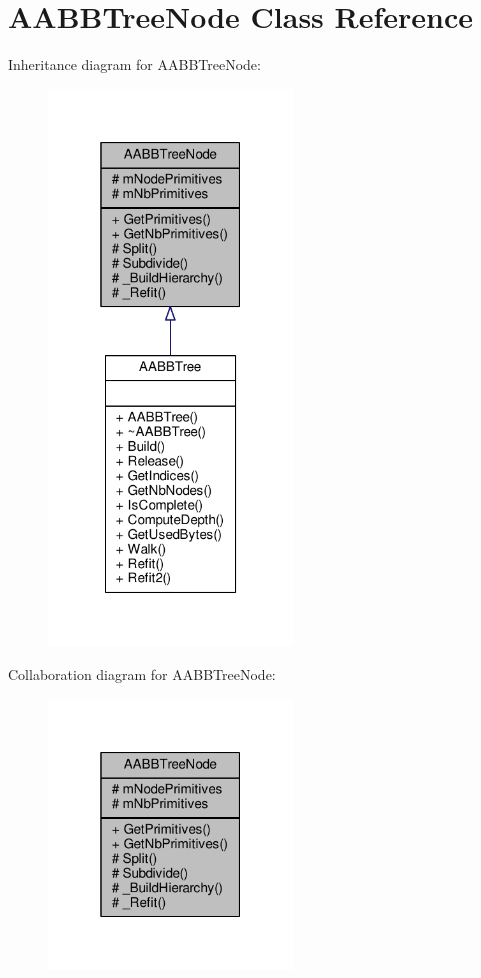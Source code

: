 \hypertarget{classAABBTreeNode}{}\section{A\+A\+B\+B\+Tree\+Node Class Reference}
\label{classAABBTreeNode}


Inheritance diagram for A\+A\+B\+B\+Tree\+Node\+:
\nopagebreak
\begin{figure}[H]
\begin{center}
\leavevmode
\includegraphics[width=184pt]{de/d0e/classAABBTreeNode__inherit__graph}
\end{center}
\end{figure}


Collaboration diagram for A\+A\+B\+B\+Tree\+Node\+:
\nopagebreak
\begin{figure}[H]
\begin{center}
\leavevmode
\includegraphics[width=184pt]{d9/d2c/classAABBTreeNode__coll__graph}
\end{center}
\end{figure}
